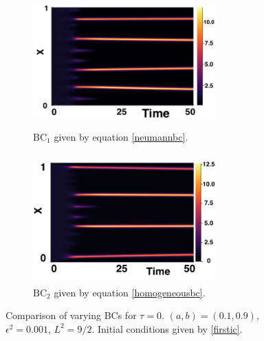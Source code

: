 \begin{figure}[H]
    \centering
    \begin{subfigure}[t]{0.45\textwidth}
        \centering
        \includegraphics[width=7cm,height=5cm]{ic20.png}
        \caption{$\text{BC}_1$ given by equation \eqref{neumannbc}.}
        \label{}
    \end{subfigure}
    \hfill
    \begin{subfigure}[t]{0.45\textwidth}
        \centering
        \includegraphics[width=7cm,height=5cm]{bc0.png}
        \caption{$\text{BC}_2$ given by equation \eqref{homogeneousbc}.}
        \label{}
    \end{subfigure}
    \caption{Comparison of varying BCs for $\tau=0$. $(a,b)=(0.1,0.9)$, $\epsilon^2=0.001$, $L^2=9/2$. Initial conditions given by \eqref{firstic}.}
    \label{fig:bctau1}
\end{figure}


